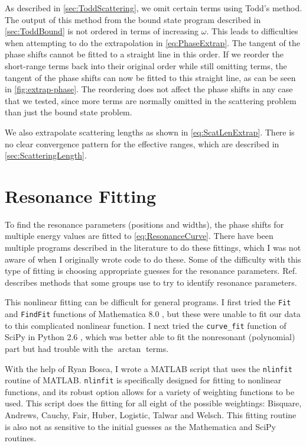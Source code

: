 \documentclass[Dissertation.tex]{subfiles}
\begin{document}
As described in \cref{sec:ToddScattering}, we omit certain terms using 
Todd's method. The output of this method from the bound state program 
described in \cref{sec:ToddBound} is not ordered in terms of 
increasing $\omega$. This leads to difficulties when attempting to do the 
extrapolation in \cref{eq:PhaseExtrap}. The tangent of the phase 
shifts cannot be fitted to a straight line in this order. If we reorder the 
short-range terms back into their original order while still omitting terms, 
the tangent of the phase shifts can now be fitted to this straight line, as 
can be seen in \cref{fig:extrap-phase}. The reordering does not affect 
the phase shifts in any case that we tested, since more terms are normally 
omitted in the scattering problem than just the bound state problem.

We also extrapolate scattering lengths as shown in \cref{eq:ScatLenExtrap}.
There is no clear convergence pattern for the effective ranges, which are
described in \cref{sec:ScatteringLength}.



\section{Resonance Fitting}
\label{sec:ResonanceFit}

To find the resonance parameters (positions and widths), the phase shifts for 
multiple energy values are fitted to \cref{eq:ResonanceCurve}. There have 
been multiple programs described in the literature
\cite{Tennyson1984, Stibbe1998, Sochi2013} to do these fittings, which I
was not aware of when I 
originally wrote code to do these. Some of the difficulty with this type of 
fitting is choosing appropriate guesses for the resonance parameters.
Ref.~\cite{Sochi2013} describes methods that some groups use to try to identify 
resonance parameters.

This nonlinear fitting can be difficult for general programs. I first tried 
the \texttt{Fit} and \texttt{FindFit} functions of
Mathematica\textsuperscript{\textregistered} 8.0 \cite{Mathematica}, but these were unable to fit our 
data to this complicated nonlinear function. I next tried the
\texttt{curve\_fit} function of SciPy \cite{SciPy} in Python\textsuperscript{\textregistered}
2.6 \cite{Python}, which was better able to fit the nonresonant (polynomial) 
part but had trouble with the $\arctan$ terms.

With the help of Ryan Bosca, I wrote a MATLAB\textsuperscript{\textregistered}
\cite{matlab} script that uses the \texttt{nlinfit} routine of MATLAB. 
\texttt{nlinfit} is specifically designed for fitting to nonlinear functions, 
and its robust option allows for a variety of weighting functions to be used. 
This script does the fitting for all eight of the possible weightings: 
Bisquare, Andrews, Cauchy, Fair, Huber, Logistic, Talwar and Welsch. This 
fitting routine is also not as sensitive to the initial guesses as the 
Mathematica and SciPy routines.
\end{document}
